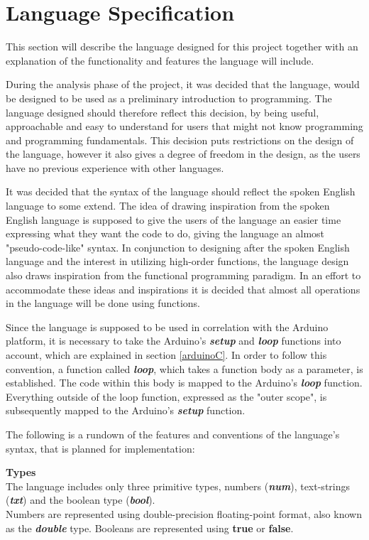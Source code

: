 \section{Language Specification}
This section will describe the language designed for this project together with an explanation of the functionality and features the language will include.

During the analysis phase of the project, it was decided that the language, would be designed to be used as a preliminary introduction to programming.
The language designed should therefore reflect this decision, by being useful, approachable and easy to understand for users that might not know programming and programming fundamentals.
This decision puts restrictions on the design of the language, however it also gives a degree of freedom in the design, as the users have no previous experience with other languages.


It was decided that the syntax of the language should reflect the spoken English language to some extend.
The idea of drawing inspiration from the spoken English language is supposed to give the users of the language an easier time expressing what they want the code to do, giving the language an almost "pseudo-code-like" syntax.
In conjunction to designing after the spoken English language and the interest in utilizing high-order functions, the language design also draws inspiration from the functional programming paradigm.
In an effort to accommodate these ideas and inspirations it is decided that almost all operations in the language will be done using functions. 

Since the language is supposed to be used in correlation with the Arduino platform, it is necessary to take the Arduino's \textbf{\textit{setup}} and \textbf{\textit{loop}} functions into account, which are explained in section \ref{arduinoC}.
In order to follow this convention, a function called \textbf{\textit{loop}}, which takes a function body as a parameter, is established. 
The code within this body is mapped to the Arduino's \textbf{\textit{loop}} function.
Everything outside of the loop function, expressed as the "outer scope", is subsequently mapped to the Arduino's \textbf{\textit{setup}} function.

The following is a rundown of the features and conventions of the language's syntax, that is planned for implementation:

\textbf{Types}\\
The language includes only three primitive types, numbers (\textbf{\textit{num}}), text-strings (\textbf{\textit{txt}}) and the boolean type (\textbf{\textit{bool}}).\\
Numbers are represented using double-precision floating-point format, also known as the \textbf{\textit{double}} type.
Booleans are represented using \textbf{true} or \textbf{false}.

